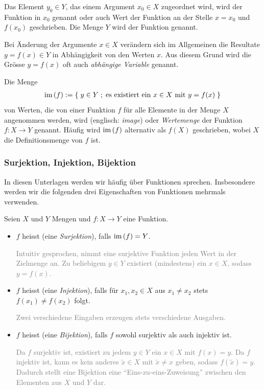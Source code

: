 Das Element $y_0\in Y$, das einem Argument $x_0\in X$ zugeordnet wird, wird  der Funktion in $x_0$ genannt oder auch Wert der Funktion an der Stelle $x = x_0$ und $f(x_0)$ geschrieben.
Die Menge $Y$ wird  der Funktion genannt.

Bei Änderung der Argumente $x\in X$ verändern sich im Allgemeinen die Resultate $y = f(x)\in Y$ in Abhängigkeit von den Werten $x$.
Aus diesem Grund wird die Grösse $y=f(x)$ oft auch \textit{abhängige Variable} genannt.
\begin{mydefinition}\label{mydefinition:bild}
Die Menge
\begin{align*}
	\text{im}\left(f\right) := \left\{\;y\in Y \; ; \; \text{es existiert ein $x\in X$ mit $y=f(x)$} \;\right\}
\end{align*}
von Werten, die von einer Funktion $f$ für alle Elemente in der Menge $X$ angenommen werden, wird  (englisch: \textit{image}) oder \textit{Wertemenge} der Funktion $f:X\to Y$ genannt.
Häufig wird $\text{im}\left(f\right)$ alternativ als $f(X)$ geschrieben, wobei $X$ die Definitionsmenge von $f$ ist.
\end{mydefinition}

\subsubsection{Surjektion, Injektion, Bijektion}
In diesen Unterlagen werden wir häufig über Funktionen sprechen. Insbesondere werden wir die folgenden drei Eigenschaften von Funktionen mehrmals verwenden.
\begin{mydefinition}\label{mydefinition:eigenschaftenFunktionen}
Seien $X$ und $Y$ Mengen und $f: X\to Y$ eine Funktion.
\begin{itemize}
	\item $f$ heisst  (eine \textit{Surjektion}), falls $\text{im}\left(f\right) = Y$.

	      \textcolor{Gray}{Intuitiv gesprochen, nimmt eine surjektive Funktion jeden Wert in der Zielmenge an. Zu beliebigem $y\in Y$ existiert (mindestens) ein $x\in X$, sodass $y=f(x)$.}
	\item $f$ heisst  (eine \textit{Injektion}), falls für $x_1,x_2\in X$ aus $x_1\neq x_2$ stets $f(x_1)\neq f(x_2)$ folgt.

	      \textcolor{Gray}{Zwei verschiedene Eingaben erzeugen stets verschiedene Ausgaben.}
	\item $f$ heisst  (eine \textit{Bijektion}), falls $f$ sowohl surjektiv als auch injektiv ist.

	      \textcolor{Gray}{Da $f$ surjektiv ist, existiert zu jedem $y\in Y$ ein $x\in X$ mit $f(x)=y$. Da $f$ injektiv ist, kann es kein anderes $\tilde{x}\in X$ mit $\tilde{x}\neq x$ geben, sodass $f(\tilde{x})=y$.
		      Dadurch stellt eine Bijektion eine \enquote{Eins-zu-eins-Zuweisung} zwischen den Elementen aus $X$ und $Y$ dar.}
\end{itemize}
\end{mydefinition}

